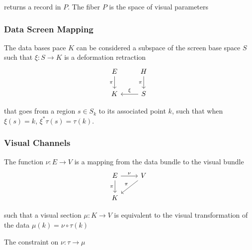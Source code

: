 \documentclass[../main.tex]{subfiles}
\begin{document}
returns a record in $P$. The fiber $P$ is the space of visual parameters %

\subsubsection{Data Screen Mapping}
The data bases pace $K$ can be considered a subspace of the screen base space $S$ such that $\xi: S \rightarrow K$ is a deformation retraction
\begin{equation}
    \begin{tikzcd}
        E \arrow[d, "\pi"'] & H \arrow[d, "\pi"'] \\
        K                   & S \arrow[l, "\xi"']
        \end{tikzcd}
\end{equation}

that goes from a region $s \in S_{k}$ to its associated point $k$, such that when $\xi(s) = k$, $\xi^*\tau(s) = \tau(k)$.

\subsubsection{Visual Channels}

The function $\nu: E \rightarrow V$ is a mapping from the data bundle to the visual bundle 
\begin{equation}
    \begin{tikzcd}
        E \arrow[d, "\pi"'] \arrow[r, "\nu"] & V \arrow[ld, "\pi"'] \\
        K                                    &                     
        \end{tikzcd}
\end{equation}

such that a visual section $\mu: K \rightarrow V$  is equivalent to the visual transformation of the data $\mu(k) = \nu\circ\tau(k)$

The constraint on $\nu: \tau\rightarrow \mu$ 

\end{document}
